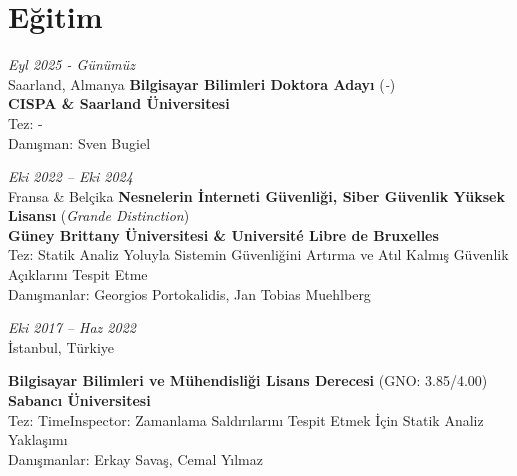 \section{Eğitim}

\begin{twocolentry}{
    \textit{Eyl 2025 - Günümüz}\\
    \small Saarland, Almanya}
    \small \textbf{Bilgisayar Bilimleri Doktora Adayı} \footnotesize(\textit{-})\\
    \normalsize \textbf{CISPA \& Saarland Üniversitesi}\\
    \small Tez: - \\
    \small Danışman: Sven Bugiel 
\end{twocolentry}

\vspace{\betweenentryspace}

\begin{twocolentry}{
    \textit{Eki 2022 – Eki 2024}\\
    \small Fransa \& Belçika}
    \small \textbf{Nesnelerin İnterneti Güvenliği, Siber Güvenlik Yüksek Lisansı} \footnotesize(\textit{Grande Distinction})\\
    \normalsize \textbf{Güney Brittany Üniversitesi \& Université Libre de Bruxelles}\\
    \small Tez: Statik Analiz Yoluyla Sistemin Güvenliğini Artırma ve Atıl Kalmış Güvenlik Açıklarını Tespit Etme\\
    \small Danışmanlar: Georgios Portokalidis, Jan Tobias Muehlberg
\end{twocolentry}

\vspace{\betweenentryspace}

\begin{twocolentry}{
    \small \textit{Eki 2017 – Haz 2022}\\
    \small İstanbul, Türkiye}

    \small \parbox{1.5\linewidth}{\textbf{Bilgisayar Bilimleri ve Mühendisliği Lisans Derecesi} \footnotesize(GNO: 3.85/4.00)\\
    \normalsize \textbf{Sabancı Üniversitesi}\\
    \small Tez: TimeInspector: Zamanlama Saldırılarını Tespit Etmek İçin Statik Analiz Yaklaşımı\\
    \small Danışmanlar: Erkay Savaş, Cemal Yılmaz}
\end{twocolentry}
